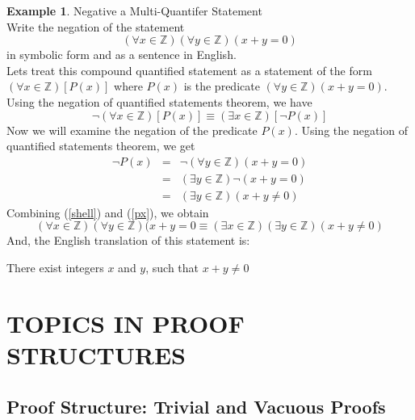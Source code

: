 \documentclass{book}
\theoremstyle{definition}
\newtheorem{example}{Example}[definition]
\theoremstyle{remark}
\newcommand{\bb}[1]{\mathbb{#1}}
\begin{document}
\begin{example}
Negative a Multi-Quantifer Statement \cite[Chap., P.C.2.21]{ted} \\

Write the negation of the statement \[ (\forall x \in \bb{Z})(\forall y \in \bb{Z})(x + y = 0) \] in symbolic form and as a sentence in English. \\


Lets treat this compound quantified statement as a statement of the form $(\forall x \in \bb{Z})[P(x)]$ where $P(x)$ is the predicate $(\forall y \in \bb{Z})(x + y = 0)$. Using the negation of quantified statements theorem, we have   
	\begin{equation}
		\label{shell}
		\neg (\forall x \in \bb{Z})[P(x)] \equiv (\exists x \in \bb{Z})[\neg P(x)]
	\end{equation}
Now we will examine the negation of the predicate $P(x)$. Using the negation of quantified statements theorem, we get
	\begin{eqnarray}
		\neg P(x) & = & \neg (\forall y \in \bb{Z})(x + y = 0) \nonumber \\
		& = & (\exists y \in \bb{Z})\neg (x + y = 0) \nonumber \\
		& = & (\exists y \in \bb{Z})(x + y \neq 0) \label{px}
	\end{eqnarray}
Combining (\ref{shell}) and (\ref{px}), we obtain \[ (\forall x \in \bb{Z})(\forall y \in \bb{Z})(x + y = 0 \equiv (\exists x \in \bb{Z})(\exists y \in \bb{Z})(x + y \neq 0)  \] And, the English translation of this statement is:
	\begin{center}
		There exist integers $x$ and $y$, such that $x + y \neq 0$	
	\end{center}
\end{example}









\newpage
\chapter{TOPICS IN PROOF STRUCTURES}
\section{Proof Structure: Trivial and Vacuous Proofs}
\end{document}
